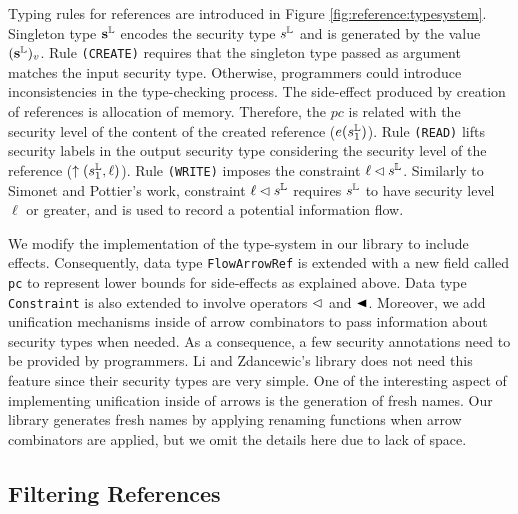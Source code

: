\documentclass[times, 10pt,twocolumn]{article}
\begin{document}
{Typing rules for references are introduced in 
Figure \ref{fig:reference:typesystem}. 
Singleton type $\mathbf{s^{\mathbb{L}}}$ encodes the security 
type $s^{\mathbb{L}}$ and is generated by the value $(\mathbf{s^{\mathbb{L}}})_v$.
Rule \texttt{(CREATE)} requires that the singleton type 
passed as argument matches the input security type. Otherwise, 
programmers could introduce inconsistencies in the 
type-checking process. 
The side-effect produced by creation of references is allocation 
of memory. Therefore, the $pc$ is related with the security 
level of the content of the created reference ($e(s^{\mathbb{L}}_1)$). Rule \texttt{(READ)} lifts 
security labels in the output security type considering the security 
level of the reference ($\uparrow (s_{1}^{\mathbb{L}}, \ell)$). 
Rule \texttt{(WRITE)} imposes the constraint $\ell\lhd s^{\mathbb{L}}$. 
Similarly to Simonet and Pottier's
work, constraint $\ell \lhd s^{\mathbb{L}}$ requires $s^{\mathbb{L}}$ to have 
security level $\ell$ or greater, and is used to record a 
potential information flow. 

We modify the implementation of the type-system in our library to include effects. 
Consequently, data type \texttt{FlowArrowRef} is extended with a new field 
called \texttt{pc} to represent lower bounds for side-effects as explained
above. Data type \texttt{Constraint} is also extended to 
involve operators $\lhd$ and $\sleql$. Moreover, we add 
unification mechanisms inside of arrow combinators to pass  
information about security types when needed. As a consequence, 
a few security annotations need to be provided by programmers. 
Li and Zdancewic's library does not need this feature since  
their security types are very simple. One of the interesting 
aspect of implementing unification inside of arrows is 
the generation of fresh names. Our library generates fresh names 
by applying renaming functions when arrow combinators are applied, 
but we omit the details here due to lack of space.



%



\subsection{Filtering References} \label{sec:proyections}

}
\end{document}
